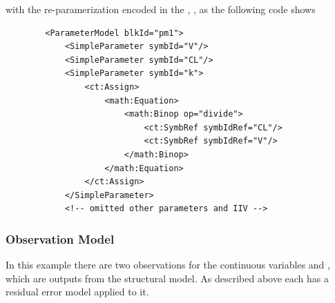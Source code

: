 with the re-paramerization encoded in the , , 
as the following code shows
\lstset{language=XML}
\begin{lstlisting}
        <ParameterModel blkId="pm1">
            <SimpleParameter symbId="V"/>
            <SimpleParameter symbId="CL"/>
            <SimpleParameter symbId="k">
                <ct:Assign>
                    <math:Equation>
                        <math:Binop op="divide">
                            <ct:SymbRef symbIdRef="CL"/>
                            <ct:SymbRef symbIdRef="V"/>
                        </math:Binop>
                    </math:Equation>
                </ct:Assign>
            </SimpleParameter>
            <!-- omitted other parameters and IIV -->

\end{lstlisting}

\subsubsection{Observation Model}
\label{sec:eg1-obs-model}

In this example there are two observations for the continuous
variables  and , which are outputs from the structural
model. As described above each has a residual error model applied to it.


